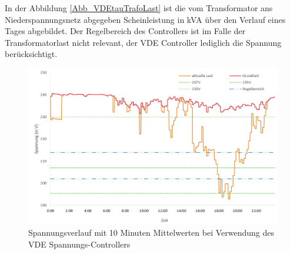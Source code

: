 In der Abbildung \ref{Abb_VDEtauTrafoLast} ist die vom Transformator ans Niederspannungsnetz abgegeben Scheinleistung in kVA über den Verlauf eines Tages abgebildet. Der Regelbereich des Controllers ist im Falle der Transformatorlast nicht relevant, der VDE Controller lediglich die Spannung berücksichtigt.
\begin{figure}[htb]
\centering
	\includegraphics[scale=0.7]{img/VDE_tau/Spannung10m6.png}
	\caption{Spannungsverlauf mit 10 Minuten Mittelwerten bei Verwendung des VDE Spannungs-Controllers}
	\label{Abb_VDEtauSpannung10m}
\end{figure}

